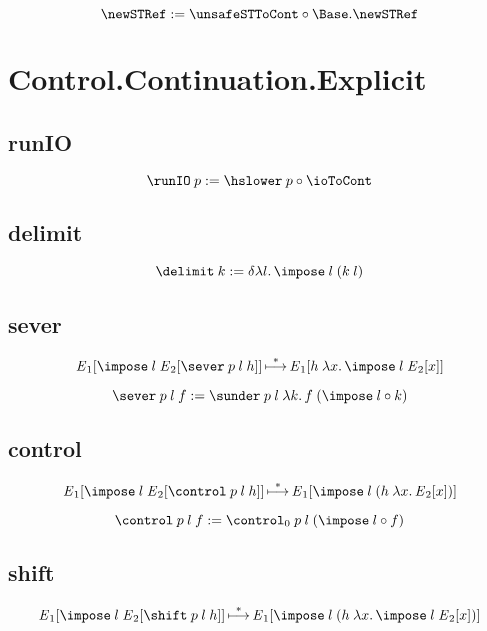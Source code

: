 \documentclass{report}
\begin{document}
\[
  \newSTRef := \unsafeSTToCont \comp \Base\qual\newSTRef
\]


\section{Control.Continuation.Explicit} %

\subsection{runIO}

\[
  \runIO \app p := \hslower \app p \comp \ioToCont
\]

\subsection{delimit}

\[
  \delimit \app k := \delta \lam l {\impose \app l \app \br{k \app l}}
\]

\subsection{sever}

\[
  {\E}_1 \sq{
    \impose \app l \app {\E}_2 \sq{\sever \app p \app l \app h}
  } \step^*
  {\E}_1 \sq{h \app \lam x {\impose \app l \app {\E}_2 \sq x}}
\]

\[
  \sever \app p \app l \app f
    := \sunder \app p \app l \app \lam k {
      f \app \br{\impose \app l \comp k}
    }
\]

\subsection{control}

\[
  {\E}_1 \sq { \impose \app l \app {\E}_2 \sq{\control \app p \app l \app h} }
    \step^*
  {\E}_1 \sq { \impose \app l \app \br{h \app \lam x {{\E}_2 \sq x}} }
\]

\[
  \control \app p \app l \app f
    := \control_0 \app p \app l \app
      {\left( \impose \app l \comp f \right)}
\]

\subsection{shift}

\[
  {\E}_1 \sq { \impose \app l \app {\E}_2 \sq{\shift \app p \app l \app h} }
    \step^*
  {\E}_1 \sq {
    \impose \app l \app \br{h \app \lam x {\impose \app l \app {\E}_2 \sq x}}
  }
\]
\end{document}
